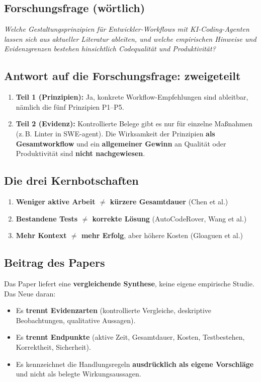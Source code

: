 \documentclass[12pt,a4paper]{article}
\newcommand{\quelle}[1]{\textcolor{grau}{(#1)}}
\begin{document}
\subsection*{Forschungsfrage (wörtlich)}
\emph{Welche Gestaltungsprinzipien für Entwickler-Workflows mit KI-Coding-Agenten lassen sich aus aktueller Literatur ableiten, und welche empirischen Hinweise und Evidenzgrenzen bestehen hinsichtlich Codequalität und Produktivität?}

\subsection*{Antwort auf die Forschungsfrage: zweigeteilt}
\begin{enumerate}
  \item \textbf{Teil 1 (Prinzipien):} Ja, konkrete Workflow-Empfehlungen sind ableitbar, nämlich die fünf Prinzipien P1--P5.
  \item \textbf{Teil 2 (Evidenz):} Kontrollierte Belege gibt es nur für einzelne Maßnahmen (z.\,B. Linter in SWE-agent). Die Wirksamkeit der Prinzipien \textbf{als Gesamtworkflow} und ein \textbf{allgemeiner Gewinn} an Qualität oder Produktivität sind \textbf{nicht nachgewiesen}.
\end{enumerate}

\subsection*{Die drei Kernbotschaften}
\begin{enumerate}
  \item \textbf{Weniger aktive Arbeit $\neq$ kürzere Gesamtdauer} \quelle{Chen et al.}
  \item \textbf{Bestandene Tests $\neq$ korrekte Lösung} \quelle{AutoCodeRover, Wang et al.}
  \item \textbf{Mehr Kontext $\neq$ mehr Erfolg}, aber höhere Kosten \quelle{Gloaguen et al.}
\end{enumerate}

\subsection*{Beitrag des Papers}
Das Paper liefert eine \textbf{vergleichende Synthese}, keine eigene empirische Studie. Das Neue daran:
\begin{itemize}
  \item Es \textbf{trennt Evidenzarten} (kontrollierte Vergleiche, deskriptive Beobachtungen, qualitative Aussagen).
  \item Es \textbf{trennt Endpunkte} (aktive Zeit, Gesamtdauer, Kosten, Testbestehen, Korrektheit, Sicherheit).
  \item Es kennzeichnet die Handlungsregeln \textbf{ausdrücklich als eigene Vorschläge} und nicht als belegte Wirkungsaussagen.
\end{itemize}
\end{document}
